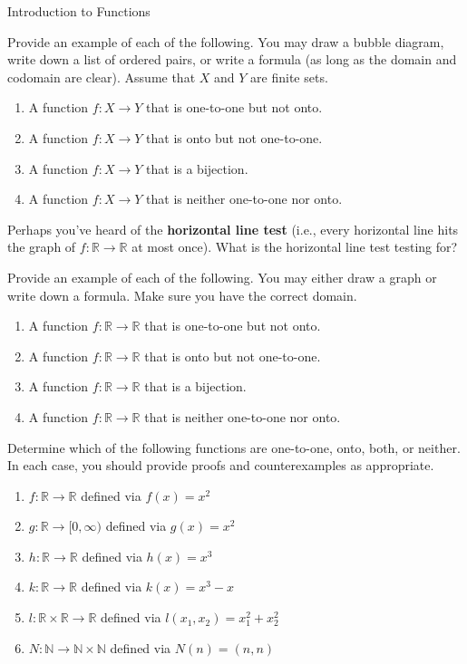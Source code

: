 \begin{section}{Introduction to Functions}
\begin{exercise}
Provide an example of each of the following.  You may draw a bubble diagram, write down a list of ordered pairs, or write a formula (as long as the domain and codomain are clear).  Assume that $X$ and $Y$ are finite sets.
\begin{enumerate}[label=\textrm{(\alph*)}]
\item A function $f:X\to Y$ that is one-to-one but not onto.
\item A function $f:X\to Y$ that is onto but not one-to-one.
\item A function $f:X\to Y$ that is a bijection.
\item A function $f:X\to Y$ that is neither one-to-one nor onto.
\end{enumerate}

\end{exercise}

\begin{problem}
Perhaps you've heard of the \textbf{horizontal line test} (i.e., every horizontal line hits the graph of $f:\mathbb{R}\to\mathbb{R}$ at most once).  What is the horizontal line test testing for?
\end{problem}

\begin{exercise}
Provide an example of each of the following.  You may either draw a graph or write down a formula.  Make sure you have the correct domain.
\begin{enumerate}[label=\textrm{(\alph*)}]
\item A function $f:\mathbb{R}\to \mathbb{R}$ that is one-to-one but not onto.
\item A function $f:\mathbb{R}\to \mathbb{R}$ that is onto but not one-to-one.
\item A function $f:\mathbb{R}\to \mathbb{R}$ that is a bijection.
\item A function $f:\mathbb{R}\to \mathbb{R}$ that is neither one-to-one nor onto.
\end{enumerate}
\end{exercise}

\begin{exercise}
Determine which of the following functions are one-to-one, onto, both, or neither.  In each case, you should provide proofs and counterexamples as appropriate.
\begin{enumerate}[label=\textrm{(\alph*)}]
\item $f:\mathbb{R}\to \mathbb{R}$ defined via $f(x)=x^{2}$
\item $g:\mathbb{R}\to [0,\infty)$ defined via $g(x)=x^{2}$
\item $h:\mathbb{R}\to \mathbb{R}$ defined via $h(x)=x^{3}$
\item $k:\mathbb{R}\to \mathbb{R}$ defined via $k(x)=x^{3}-x$
\item $l: \mathbb{R}\times \mathbb{R}\to \mathbb{R}$ defined via $l(x_{1},x_{2})=x_{1}^{2}+x_{2}^{2}$
\item $N:\mathbb{N}\to \mathbb{N}\times \mathbb{N}$ defined via $N(n)=(n,n)$
\end{enumerate}
\end{exercise}


\end{section}
